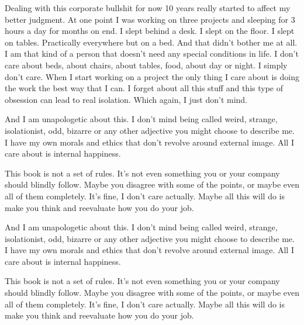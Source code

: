 Dealing with this corporate bullshit for now 10 years really started to affect my better judgment. At one point I was working on three projects and sleeping for 3 hours a day for months on end. I slept behind a desk. I slept on the floor. I slept on tables. Practically everywhere but on a bed. And that didn’t bother me at all. I am that kind of a person that doesn’t need any special conditions in life. I don’t care about beds, about chairs, about tables, food, about day or night. I simply don’t care. When I start working on a project the only thing I care about is doing the work the best way that I can. I forget about all this stuff and this type of obsession can lead to real isolation. Which again, I just don’t mind.

And I am unapologetic about this. I don’t mind being called weird, strange, isolationist, odd, bizarre or any other adjective you might choose to describe me. I have my own morals and ethics that don’t revolve around external image. All I care about is internal happiness.

This book is not a set of rules. It’s not even something you or your company should blindly follow. Maybe you disagree with some of the points, or maybe even all of them completely. It’s fine, I don’t care actually. Maybe all this will do is make you think and reevaluate how you do your job.

And I am unapologetic about this. I don’t mind being called weird, strange, isolationist, odd, bizarre or any other adjective you might choose to describe me. I have my own morals and ethics that don’t revolve around external image. All I care about is internal happiness.

This book is not a set of rules. It’s not even something you or your company should blindly follow. Maybe you disagree with some of the points, or maybe even all of them completely. It’s fine, I don’t care actually. Maybe all this will do is make you think and reevaluate how you do your job.
